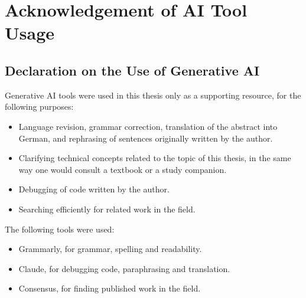 \chapter{Acknowledgement of AI Tool Usage}\label{ch:ai-usage}

\section*{Declaration on the Use of Generative AI}

Generative AI tools were used in this thesis only as a supporting resource, for the following
purposes:

\begin{itemize}[topsep=0.3em,itemsep=0.25em]
  \item Language revision, grammar correction, translation of the abstract into German, and
    rephrasing of sentences originally written by the author.
  \item Clarifying technical concepts related to the topic of this thesis, in the same way one would
    consult a textbook or a study companion.
  \item Debugging of code written by the author.
  \item Searching efficiently for related work in the field.
\end{itemize}

The following tools were used:

\begin{itemize}[topsep=0.3em,itemsep=0.25em]
  \item Grammarly, for grammar, spelling and readability.
  \item Claude, for debugging code, paraphrasing and translation.
  \item Consensus, for finding published work in the field.
\end{itemize}
